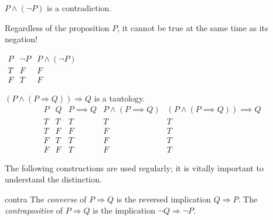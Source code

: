 \begin{examples}{}{}
\exstart $P\wedge(\neg P)$ is a contradiction.
	
\begin{enumerate}\setcounter{enumi}{1}
  \begin{minipage}[t]{0.65\linewidth}\vspace{-8pt}
  	\item[] Regardless of the proposition $P$, it cannot be true at the same time as its negation!
  \end{minipage}
  \hfill
  \begin{minipage}[t]{0.29\linewidth}\vspace{-27pt}
	$\begin{array}{cc|c}
	P & \neg P & P\wedge(\neg P)\\\hline
	T & F & F\\
	F & T & F
	\end{array}$
  \end{minipage}\par
  
	\item $(P\wedge(P\Longrightarrow Q))\Longrightarrow Q$ is a tautology.%
	\[\begin{array}{cc||c|c||c}
	P & Q & P\implies Q & P\wedge(P\implies Q) & (P\wedge(P\implies Q))\implies Q\\\hline
	T & T & T & T& T\\
	T & F & F & F& T\\
	F & T & T & F& T\\
	F & F & T & F& T
	\end{array}\]
	\end{enumerate}
\end{examples}



The following constructions are used regularly; it is vitally important to understand the distinction.

\begin{defn}{}{contra}
	The \emph{converse} of $P\Longrightarrow Q$ is the reversed implication $Q\Longrightarrow P$.\smallbreak
	The \emph{contrapositive} of $P\Longrightarrow Q$ is the implication $\neg Q\Longrightarrow\neg P$.
\end{defn}

